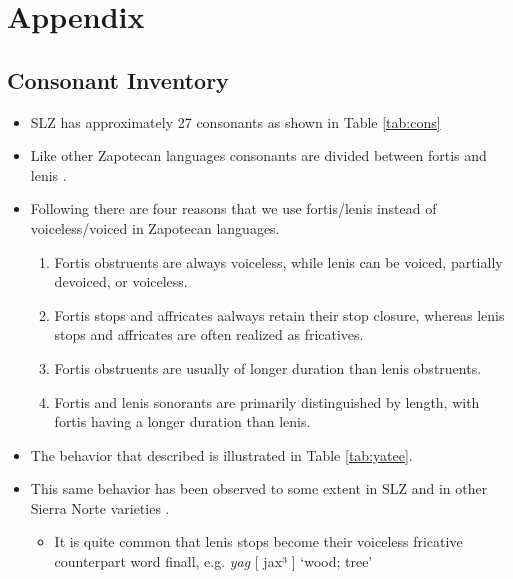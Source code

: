\documentclass[12pt, letterpaper]{article}
\begin{document}

\printbibliography[heading=bibintoc]


\section*{Appendix} 
\subsection*{Consonant Inventory} \label{sec:Consonants}

\begin{itemize}
	\item SLZ has approximately 27 consonants as shown in Table \ref{tab:cons}

	\item Like other Zapotecan languages consonants are divided between fortis and lenis \citep{nellisFortisLenisCajonos1980,jaegerInitialConsonantClusters1982,uchiharaFortisLenisGlides2016}.

	\item Following \citet{jaegerInitialConsonantClusters1982} there are four reasons that we use fortis/lenis instead of voiceless/voiced in Zapotecan languages.
	\begin{enumerate}
		\item Fortis obstruents are always voiceless, while lenis can be voiced, partially devoiced, or voiceless.
		\item Fortis stops and affricates aalways retain their stop closure, whereas lenis stops and affricates are often realized as fricatives.
		\item Fortis obstruents are usually of longer duration than lenis obstruents.
		\item Fortis and lenis sonorants are primarily distinguished by length, with fortis having a longer duration than lenis. 
	\end{enumerate}
	\item The behavior that \citet{jaegerInitialConsonantClusters1982} described is illustrated in Table \ref{tab:yatee}. 
	\item This same behavior has been observed to some extent in SLZ and in other Sierra Norte varieties \citep{sonnenscheinDescriptiveGrammarSan2005}.
	\begin{itemize}
		\item It is quite common that lenis stops become their voiceless fricative counterpart word finall, e.g. \textit{yag} [ jax³ ] `wood; tree'
	\end{itemize}
\end{itemize}
\end{document}
